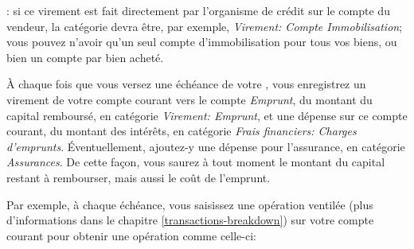 \Note{}: si ce virement est fait directement par l'organisme de crédit sur le compte du vendeur, la catégorie devra être, par exemple, \emph{Virement: Compte Immobilisation}; vous pouvez n'avoir qu'un seul compte d'immobilisation pour tous vos biens, ou bien un compte par bien acheté.

À chaque fois que vous versez une échéance de votre , vous enregistrez un virement de votre compte courant vers le compte \emph{Emprunt}, du montant du capital remboursé, en catégorie \emph{Virement: Emprunt}, et une dépense sur ce compte courant, du montant des intérêts, en catégorie \emph{Frais financiers: Charges d'emprunts}. Éventuellement, ajoutez-y une dépense pour l'assurance, en catégorie \emph{Assurances}. De cette façon, vous saurez à tout moment le montant du capital restant à rembourser, mais aussi le coût de l'emprunt.


Par exemple, à chaque échéance, vous saisissez une opération ventilée (plus d'informations dans le chapitre \vref{transactions-breakdown}) sur votre compte courant pour obtenir une opération comme celle-ci:

